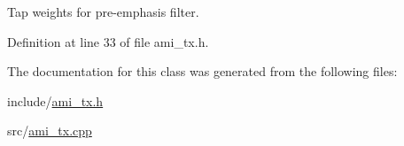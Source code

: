 Tap weights for pre-\/emphasis filter. 



Definition at line 33 of file ami\+\_\+tx.\+h.



The documentation for this class was generated from the following files\+:\begin{DoxyCompactItemize}
\item 
include/\hyperlink{ami__tx_8h}{ami\+\_\+tx.\+h}\item 
src/\hyperlink{ami__tx_8cpp}{ami\+\_\+tx.\+cpp}\end{DoxyCompactItemize}
